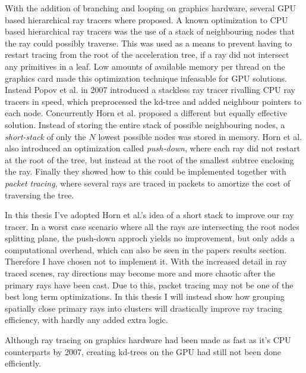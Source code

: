 With the addition of branching and looping on graphics hardware,
several GPU based hierarchical ray tracers where proposed. A known
optimization to CPU based hierarchical ray tracers was the use of a
stack of neighbouring nodes that the ray could possibly traverse. This
was used as a means to prevent having to restart tracing from the root
of the acceleration tree, if a ray did not intersect any primitives in
a leaf. Low amounts of available memory per thread on the graphics
card made this optimization technique infeasable for GPU
solutions. Instead Popov et al. in 2007
introduced a stackless ray tracer rivalling CPU ray tracers in speed,
which preprocessed the kd-tree and added neighbour pointers to each
node. Concurrently Horn et al. proposed a different
but equally effective solution. Instead of storing the entire stack of
possible neighbouring nodes, a \textit{short-stack} of only the $N$
lowest possible nodes was stored in memory. Horn et al. also
introduced an optimization called \textit{push-down}, where each ray
did not restart at the root of the tree, but instead at the root of
the smallest subtree enclosing the ray. Finally they showed how to
this could be implemented together with \textit{packet tracing}, where
several rays are traced in packets to amortize the cost of traversing
the tree.

In this thesis I've adopted Horn et al.'s idea of a short stack to
improve our ray tracer. In a worst case scenario where all the rays
are intersecting the root nodes splitting plane, the push-down approch
yields no improvement, but only adds a computational overhead, which
can also be seen in the papers results section. Therefore I have
chosen not to implement it. With the increased detail in ray traced
scenes, ray directions may become more and more chaotic after the
primary rays have been cast. Due to this, packet tracing may not be
one of the best long term optimizations. In this thesis I will instead
show how grouping spatially close primary rays into clusters will
drastically improve ray tracing efficiency, with hardly any added
extra logic.



Although ray tracing on graphics hardware had been made as fast as
it's CPU counterparts by 2007, creating kd-trees on the GPU had still
not been done efficiently.


